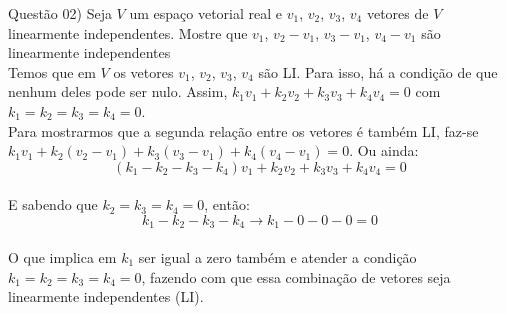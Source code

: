 
\noindent \textcolor{COLOR1}{Questão 02)} Seja $V$ um espaço vetorial real e $v_1$, $v_2$, $v_3$, $v_4$ vetores de $V$ linearmente independentes. Mostre que $v_1$, $v_2-v_1$, $v_3-v_1$, $v_4-v_1$ são linearmente independentes
\\

Temos que em $V$ os vetores $v_1$, $v_2$, $v_3$, $v_4$ são LI. Para isso, há a condição de que nenhum deles pode ser nulo. Assim, $k_1v_1+ k_2v_2 + k_3v_3 + k_4v_4 = 0 $ com $k_1=k_2=k_3=k_4=0$.
\\

Para mostrarmos que a segunda relação entre os vetores é também LI, faz-se $k_1v_1+k_2(v_2-v_1)+k_3(v_3-v_1) + k_4(v_4-v_1)=0$. Ou ainda:
\\

\[
    (k_1-k_2-k_3-k_4)v_1 + k_2v_2 + k_3v_3 + k_4v_4 = 0
\]
\\

E sabendo que $k_2=k_3=k_4=0$, então:
\\

\[
    k_1-k_2-k_3-k_4\to k_1-0-0-0=0
\]
\\

O que implica em $k_1$ ser igual a zero também e atender a condição $k_1=k_2=k_3=k_4=0$, fazendo com que essa combinação de vetores seja linearmente independentes (LI).\\